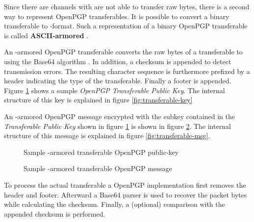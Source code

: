 Since there are channels with are not able to transfer raw bytes, there is a second way to represent OpenPGP transferables. It is possible to convert a binary transferable to -format. Such a representation of a binary OpenPGP transferable is called \textbf{ASCII-armored} \cite[section 6]{RFC4880}.

An -armored OpenPGP transferable converts the raw bytes of a transferable to  using the Base64 algorithm \citep{RFC4648}. In addition, a  \cite[section 6.1]{RFC4880} checksum is appended to detect transmission errors. The resulting character sequence is furthermore prefixed by a header indicating the type of the transferable. Finally a footer is appended. \\

Figure \ref{fig:key} shows a sample \textit{OpenPGP Transferable Public Key}. The internal structure of this key is explained in figure \ref{fig:transferable-key}

An -armored OpenPGP message encrypted with the subkey contained in the \textit{Transferable Public Key} shown in figure \ref{fig:key} is shown in figure \ref{fig:msg}. The internal structure of this message is explained in figure \ref{fig:transferable-msg}. \\

\begin{figure}[p]
	\centering
	
	\caption{Sample -armored transferable OpenPGP public-key}
	\label{fig:key}
\end{figure}

\begin{figure}[p]
	\centering
	
	\caption{Sample -armored transferable OpenPGP message}
	\label{fig:msg}
\end{figure}

To process the actual transferable a OpenPGP implementation first removes the header and footer. Afterward a Base64 parser is used to recover the packet bytes while calculating the  checksum. Finally, a (optional) comparison with the appended checksum is performed.




